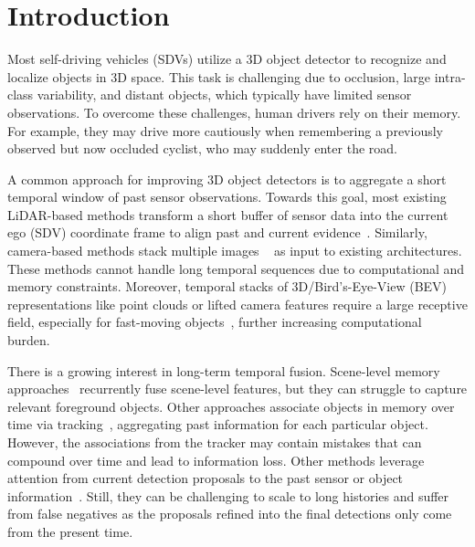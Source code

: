 \section{Introduction}
\label{sec:intro}

Most self-driving vehicles (SDVs) utilize a 3D object detector to recognize and localize objects in 3D space.
This task is challenging due to occlusion, large intra-class variability, and distant objects, which typically have limited sensor observations.
To overcome these challenges, human drivers rely on their memory.
For example, they may drive more cautiously when remembering a previously observed but now occluded cyclist, who may suddenly enter the road.
\renewcommand{\thefootnote}{\fnsymbol{footnote}}
\renewcommand{\thefootnote}{\arabic{footnote}}

A common approach for improving 3D object detectors is to aggregate a short temporal window of past sensor observations.
Towards this goal, most existing LiDAR-based methods transform a short buffer of sensor data into the current ego (SDV) coordinate frame
to align past and current evidence~\cite{caesar2020nuscenes,sun2022swformer,yang20213d,centerpoint,luo2018fast}. Similarly, camera-based methods stack multiple images ~\cite{zeng2022lift,piergiovanni20214d} as input to existing architectures.
These methods cannot handle long temporal sequences due to computational and memory constraints.
Moreover, temporal stacks of 3D/Bird's-Eye-View (BEV) representations
like point clouds or lifted camera features require a large receptive field,
especially for fast-moving objects~\cite{li2023modar}, further increasing computational burden.

There is a growing interest in long-term temporal fusion.
Scene-level memory approaches~\cite{he2023lef,li2022bevformer,frossard2021strobe}
recurrently fuse scene-level features,
but they can struggle to capture relevant foreground objects.
Other approaches associate objects in memory over time via tracking~\cite{liang2020pnpnet,chen2022mppnet,li2023modar,huang2024ptt}, aggregating past information for each particular object.
However, the associations from the tracker may contain mistakes that can compound over time and lead to information loss. 
Other methods leverage attention from current detection proposals to the past sensor or object information~\cite{he2023msf,yang20213d,hou2024query}. Still, they can be challenging to scale to long histories and suffer from false negatives as the proposals refined into the final detections only come from the present time.

